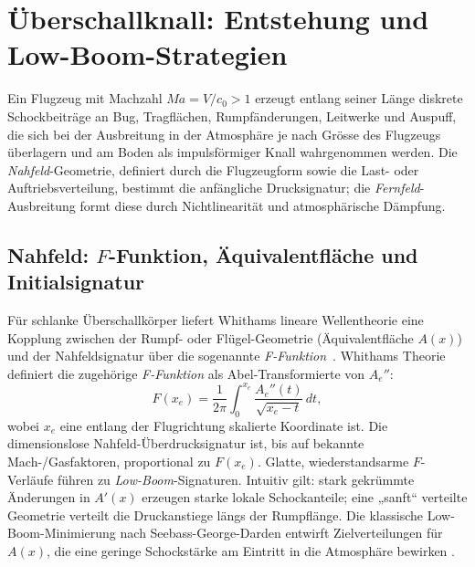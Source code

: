 \section{Überschallknall: Entstehung und Low-Boom-Strategien}
\label{schall:section:boom}

Ein Flugzeug mit Machzahl $\textit{Ma}=V/c_0>1$ erzeugt entlang seiner Länge diskrete
Schockbeiträge an Bug, Tragflächen, Rumpfänderungen, Leitwerke und Auspuff,
die sich bei der Ausbreitung in der Atmosphäre je nach Grösse des Flugzeugs
überlagern und am Boden als impulsförmiger Knall wahrgenommen werden.
Die \emph{Nahfeld}-Geometrie, definiert durch die Flugzeugform sowie die  Last- oder
Auftriebsverteilung, bestimmt die anfängliche Drucksignatur;
die \emph{Fernfeld}-Ausbreitung formt diese durch Nichtlinearität und atmosphärische Dämpfung.

\subsection{Nahfeld: $F$-Funktion, Äquivalentfläche und Initialsignatur}
Für schlanke Überschallkörper liefert Whithams lineare Wellentheorie eine Kopplung
zwischen der Rumpf- oder Flügel-Geometrie (Äquivalentfläche $A(x)$) und der
Nahfeldsignatur über die sogenannte \emph{F-Funktion}~\cite{schall:whitham}.
Whithams Theorie definiert die zugehörige \emph{F-Funktion}
als Abel-Transformierte von $A_e''$:
\begin{equation}
    F(x_e)=\frac{1}{2\pi}\int_{0}^{x_e}\frac{A_e''(t)}{\sqrt{x_e-t}}\,dt,
\end{equation}
wobei $x_e$ eine entlang der Flugrichtung skalierte Koordinate ist.
Die dimensionslose Nahfeld-Überdrucksignatur ist, bis auf bekannte
Mach-/Gasfaktoren, proportional zu $F(x_e)$.
Glatte, wiederstandsarme $F$-Verläufe führen zu \emph{Low-Boom}-Signaturen.
Intuitiv gilt: stark gekrümmte Änderungen in $A'(x)$ erzeugen starke lokale
Schockanteile; eine „sanft“ verteilte Geometrie verteilt die Druckanstiege
längs der Rumpflänge.
Die klassische Low-Boom-Minimierung nach Seebass-George-Darden entwirft
Zielverteilungen für $A(x)$, die eine geringe Schockstärke am Eintritt in
die Atmosphäre bewirken \cite{schall:whitham,schall:seebassgeorge,schall:darden75}.

